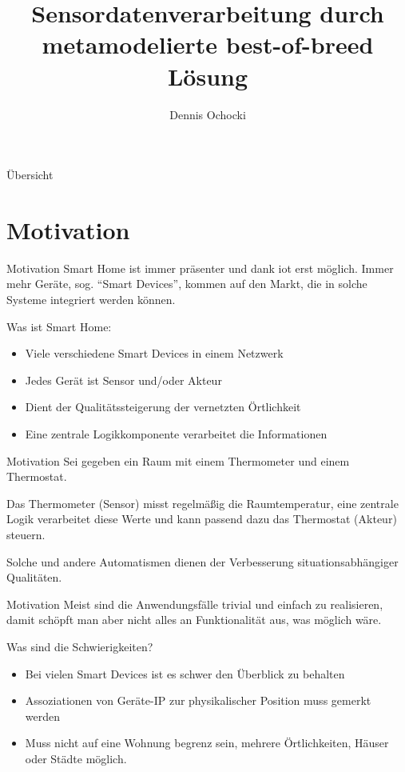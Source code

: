 \documentclass[12pt, pdf, xcolor={table, dvipsnames}, paperheight=8cm,paperwidth=12cm]{beamer}
\author{Dennis Ochocki}
\title[]{Sensordatenverarbeitung durch metamodelierte best-of-breed Lösung}
\begin{document}
	
\maketitle

\begin{frame}{Übersicht}
	\tableofcontents
\end{frame}

\section{Motivation}
\begin{frame}{Motivation}
	Smart Home ist immer präsenter und dank \gls{iot} erst möglich. Immer mehr Geräte, sog. \enquote{Smart Devices}, kommen auf den Markt, die in solche Systeme integriert werden können. 
	
	
	\begin{block}{Was ist Smart Home:}
		\begin{itemize}
			\item Viele verschiedene Smart Devices in einem Netzwerk
			\item Jedes Gerät ist Sensor und/oder Akteur
			\item Dient der Qualitätssteigerung der vernetzten Örtlichkeit
			\item Eine zentrale Logikkomponente verarbeitet die Informationen
		\end{itemize}
	\end{block}
\end{frame}

\begin{frame}{Motivation}
	Sei gegeben ein Raum mit einem Thermometer und einem Thermostat.
	
	\vspace{1em}
	Das Thermometer (Sensor) misst regelmäßig die Raumtemperatur, eine zentrale Logik verarbeitet diese Werte und kann passend dazu das Thermostat (Akteur) steuern.
	
	\vspace{1em}
	Solche und andere Automatismen dienen der Verbesserung situationsabhängiger Qualitäten.
\end{frame}

\begin{frame}{Motivation}
Meist sind die Anwendungsfälle trivial und einfach zu realisieren, damit schöpft man aber nicht alles an Funktionalität aus, was möglich wäre.
\begin{block}{Was sind die Schwierigkeiten?}
	\begin{itemize}
		\item Bei vielen Smart Devices ist es schwer den Überblick zu behalten
		\item Assoziationen von Geräte-IP zur physikalischer Position muss gemerkt werden
		\item Muss nicht auf eine Wohnung begrenz sein, mehrere Örtlichkeiten, Häuser oder Städte möglich.
	\end{itemize}
\end{block}
\end{frame}
\end{document}
